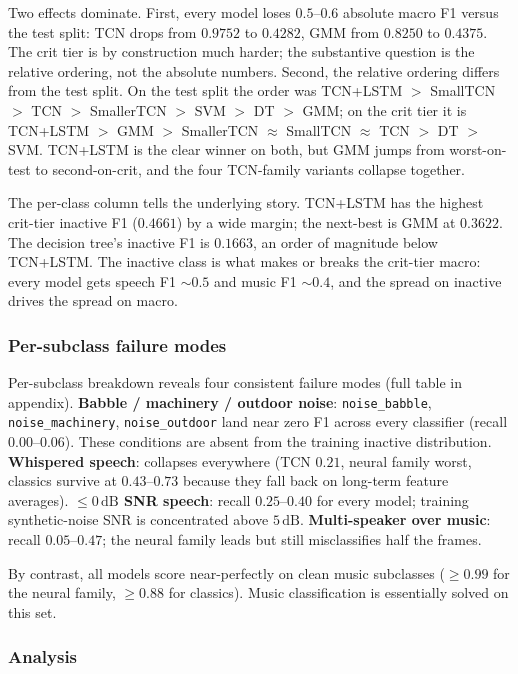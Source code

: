 Two effects dominate.
First, every model loses $0.5$--$0.6$ absolute macro F1 versus the test split: TCN drops from $0.9752$ to $0.4282$, GMM from $0.8250$ to $0.4375$.
The crit tier is by construction much harder; the substantive question is the relative ordering, not the absolute numbers.
Second, the relative ordering differs from the test split.
On the test split the order was TCN+LSTM $>$ SmallTCN $>$ TCN $>$ SmallerTCN $>$ SVM $>$ DT $>$ GMM; on the crit tier it is TCN+LSTM $>$ GMM $>$ SmallerTCN $\approx$ SmallTCN $\approx$ TCN $>$ DT $>$ SVM.
TCN+LSTM is the clear winner on both, but GMM jumps from worst-on-test to second-on-crit, and the four TCN-family variants collapse together.

The per-class column tells the underlying story.
TCN+LSTM has the highest crit-tier inactive F1 ($0.4661$) by a wide margin; the next-best is GMM at $0.3622$.
The decision tree's inactive F1 is $0.1663$, an order of magnitude below TCN+LSTM.
The inactive class is what makes or breaks the crit-tier macro: every model gets speech F1 $\sim 0.5$ and music F1 $\sim 0.4$, and the spread on inactive drives the spread on macro.

\subsubsection*{Per-subclass failure modes}

Per-subclass breakdown reveals four consistent failure modes (full table in appendix).
\textbf{Babble / machinery / outdoor noise}: \texttt{noise\_babble}, \texttt{noise\_machinery}, \texttt{noise\_outdoor} land near zero F1 across every classifier (recall $0.00$--$0.06$).
These conditions are absent from the training inactive distribution.
\textbf{Whispered speech}: collapses everywhere (TCN $0.21$, neural family worst, classics survive at $0.43$--$0.73$ because they fall back on long-term feature averages).
\textbf{$\le 0\,\text{dB}$ SNR speech}: recall $0.25$--$0.40$ for every model; training synthetic-noise SNR is concentrated above $5\,\text{dB}$.
\textbf{Multi-speaker over music}: recall $0.05$--$0.47$; the neural family leads but still misclassifies half the frames.

By contrast, all models score near-perfectly on clean music subclasses ($\geq 0.99$ for the neural family, $\geq 0.88$ for classics).
Music classification is essentially solved on this set.

\subsubsection*{Analysis}

